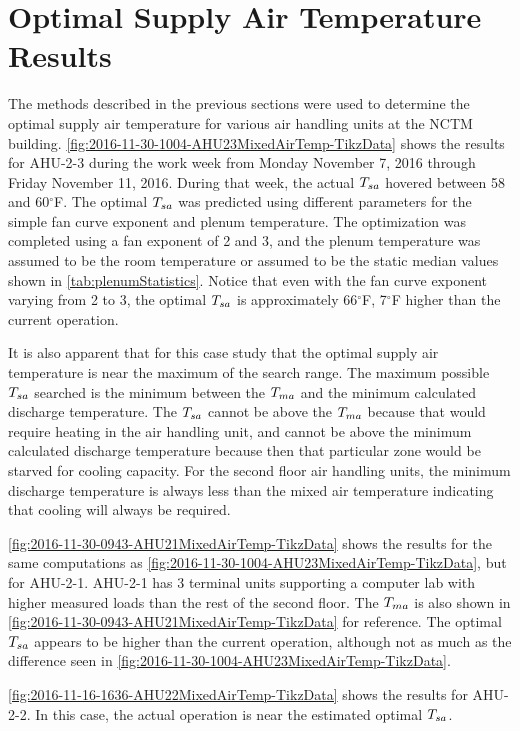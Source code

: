 \section{Optimal Supply Air Temperature Results}

The methods described in the previous sections were used to determine the optimal supply air temperature for various air handling units at the NCTM building. 
\figref{} \ref{fig:2016-11-30-1004-AHU23MixedAirTemp-TikzData} shows the results for AHU-2-3 during the work week from Monday November 7, 2016 through Friday November 11, 2016. 
During that week, the actual \(T_{sa}\) hovered between 58 and 60\(^\circ\)F. The optimal \(T_{sa}\) was predicted using different parameters for the simple fan curve exponent and plenum temperature. 
The optimization was completed using a fan exponent of 2 and 3, and the plenum temperature was assumed to be the room temperature or assumed to be the static median values shown in \tableref{} \ref{tab:plenumStatistics}. 
Notice that even with the fan curve exponent varying from 2 to 3, the optimal \(T_{sa}\) is approximately 66\(^\circ\)F, 7\(^\circ\)F higher than the current operation. 

It is also apparent that for this case study that the optimal supply air temperature is near the maximum of the search range.
The maximum possible \(T_{sa}\) searched is the minimum between the \(T_{ma}\) and the minimum calculated discharge temperature. The \(T_{sa}\) cannot be above the \(T_{ma}\) because that would require heating in the air handling unit, and cannot be above the minimum calculated discharge temperature because then that particular zone would be starved for cooling capacity.
For the second floor air handling units, the minimum discharge temperature is always less than the mixed air temperature indicating that cooling will always be required.  

\figref{} \ref{fig:2016-11-30-0943-AHU21MixedAirTemp-TikzData} shows the results for the same computations as \figref{} \ref{fig:2016-11-30-1004-AHU23MixedAirTemp-TikzData}, but for AHU-2-1.
AHU-2-1 has 3 terminal units supporting a computer lab with higher measured loads than the rest of the second floor.
The \(T_{ma}\) is also shown in \figref{} \ref{fig:2016-11-30-0943-AHU21MixedAirTemp-TikzData} for reference. The optimal \(T_{sa}\) appears to be higher than the current operation, although not as much as the difference seen in \figref{} \ref{fig:2016-11-30-1004-AHU23MixedAirTemp-TikzData}.


\figref{} \ref{fig:2016-11-16-1636-AHU22MixedAirTemp-TikzData} shows the results for AHU-2-2. 
In this case, the actual operation is near the estimated optimal \(T_{sa}\).

